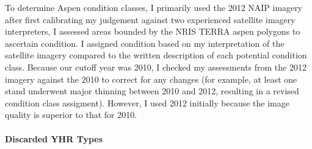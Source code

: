 To determine Aspen condition classes, I primarily used the 2012 NAIP imagery after first calibrating my judgement against two experienced satellite imagery interpreters, I assessed areas bounded by the NRIS TERRA aspen polygons to ascertain condition. I assigned condition based on my interpretation of the satellite imagery compared to the written description of each potential condition class. Because our cutoff year was 2010, I checked my assessments from the 2012 imagery against the 2010 to correct for any changes (for example, at least one stand underwent major thinning between 2010 and 2012, resulting in a revised condition class assigment). However, I used 2012 initially because the image quality is superior to that for 2010.

\paragraph{Discarded YHR Types}
